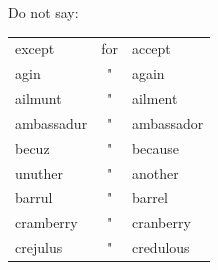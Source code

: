 \documentclass[10pt]{article}
\begin{document}
Do not say:

\begin{center}
\begin{tabular}{lcl}
except & for & accept \\
agin & " & again \\
ailmunt & " & ailment \\
ambassadur & " & ambassador \\
becuz & " & because \\
unuther & " & another \\
barrul & " & barrel \\
cramberry & " & cranberry \\
crejulus & " & credulous \\
\end{tabular}
\end{center}
\end{document}
